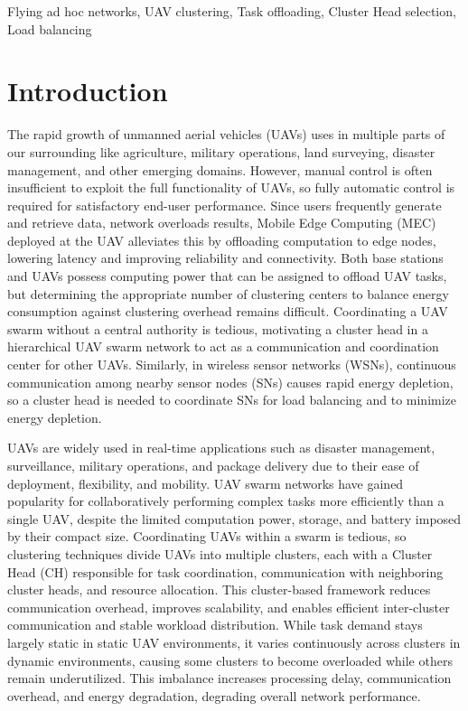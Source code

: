 \documentclass[journal]{IEEEtran}
\begin{document}
\begin{IEEEkeywords}Flying ad hoc networks, UAV clustering, Task offloading, Cluster Head selection, Load balancing\end{IEEEkeywords}


\section{Introduction}

The rapid growth of unmanned aerial vehicles (UAVs) uses in multiple parts of our surrounding like agriculture, military operations, land surveying, disaster management, and other emerging domains. However, manual control is often insufficient to exploit the full functionality of UAVs, so fully automatic control is required for satisfactory end-user performance. Since users frequently generate and retrieve data, network overloads results, Mobile Edge Computing (MEC) deployed at the UAV alleviates this by offloading computation to edge nodes, lowering latency and improving reliability and connectivity\cite{ref1}. Both base stations and UAVs possess computing power that can be assigned to offload UAV tasks, but determining the appropriate number of clustering centers to balance energy consumption against clustering overhead remains difficult\cite{ref2}. Coordinating a UAV swarm without a central authority is tedious, motivating a cluster head in a hierarchical UAV swarm network to act as a communication and coordination center for other UAVs\cite{ref3}. Similarly, in wireless sensor networks (WSNs), continuous communication among nearby sensor nodes (SNs) causes rapid energy depletion, so a cluster head is needed to coordinate SNs for load balancing and to minimize energy depletion\cite{ref4}.

UAVs are widely used in real-time applications such as disaster management, surveillance, military operations, and package delivery due to their ease of deployment, flexibility, and mobility. UAV swarm networks have gained popularity for collaboratively performing complex tasks more efficiently than a single UAV, despite the limited computation power, storage, and battery imposed by their compact size. Coordinating UAVs within a swarm is tedious, so clustering techniques divide UAVs into multiple clusters, each with a Cluster Head (CH) responsible for task coordination, communication with neighboring cluster heads, and resource allocation. This cluster-based framework reduces communication overhead, improves scalability, and enables efficient inter-cluster communication and stable workload distribution. While task demand stays largely static in static UAV environments, it varies continuously across clusters in dynamic environments, causing some clusters to become overloaded while others remain underutilized. This imbalance increases processing delay, communication overhead, and energy degradation, degrading overall network performance.
\end{document}
